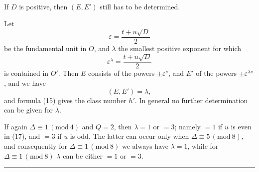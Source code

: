 If $D$ is positive, then $(E, E')$ still has to be determined.

Let
\[
\varepsilon = \frac{t + u\sqrt{D}}{2}
\]
be the fundamental unit in $O$, and $\lambda$ the smallest positive exponent for which
\[\varepsilon^{\lambda} = \frac{t + u\sqrt{D}}{2}\]
is contained in $O'$. Then $E$ consists of the powers $\pm \varepsilon^{\nu}$, and $E'$ of the powers $\pm \varepsilon^{\lambda\nu}$, and we have
\[
(E, E') = \lambda,
\]
and formula (15) gives the class number $h'$. In general no further determination can be given for $\lambda$.

If again $\Delta \equiv 1 \, (\mathrm{mod}\ 4)$ and $Q = 2$, then $\lambda = 1$ or $= 3$; namely $= 1$ if $u$ is even in (17), and $= 3$ if $u$ is odd. The latter can occur only when $\Delta \equiv 5 \, (\mathrm{mod}\ 8)$, and consequently for $\Delta \equiv 1 \, (\mathrm{mod}\ 8)$ we always have $\lambda = 1$, while for $\Delta \equiv 1 \, (\mathrm{mod}\ 8)$ %
$\lambda$ can be either $= 1$ or $= 3$.

\begin{center}\rule{0.32\linewidth}{0.4pt}\end{center}
